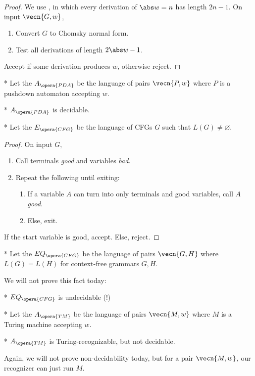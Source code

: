 \begin{proof}
	We use , in which every derivation of $\abs w = n$ has length $2n-1$.
	On input $\vecn{G,w}$, 
	\begin{enumerate}
		\item Convert $G$ to Chomsky normal form.
		\item Test all derivations of length $2\abs w - 1$.
	\end{enumerate}	
	Accept if some derivation produces $w$, otherwise reject.
\end{proof}

\begin{defn}*
	Let the  $A_{\opera{PDA}}$ be the language of pairs $\vecn{P,w}$ where $P$ is a pushdown automaton accepting $w$.
\end{defn}

\begin{cor}*
	$A_{\opera{PDA}}$ is decidable.
\end{cor}

\begin{defn}*
	Let the  $E_{\opera{CFG}}$ be the language of CFGs $G$ such that $L(G) \neq \varnothing$.
\end{defn}

\begin{proof}
	On input $G$, 
	\begin{enumerate}
		\item Call terminals \emph{good} and variables \emph{bad}.
		\item Repeat the following until exiting:
			\begin{enumerate}
				\item If a variable $A$ can turn into only terminals and good variables, call $A$ \emph{good}.
				\item Else, exit.
			\end{enumerate}
	\end{enumerate}
	If the start variable is good, accept. Else, reject.
\end{proof}

\begin{defn}*
	Let the  $EQ_{\opera{CFG}}$ be the language of pairs $\vecn{G,H}$ where $L(G) = L(H)$ for context-free grammars $G,H$.
\end{defn}

We will not prove this fact today:

\begin{fact}*
	$EQ_{\opera{CFG}}$ is undecidable (!)
\end{fact}

\begin{defn}*
	Let the  $A_{\opera{TM}}$ be the language of pairs $\vecn{M,w}$ where $M$ is a Turing machine accepting $w$.
\end{defn}

\begin{fact}*
	$A_{\opera{TM}}$ is Turing-recognizable, but not decidable.	
\end{fact}

Again, we will not prove non-decidability today, but for a pair $\vecn{M,w}$, our recognizer can just run $M$.
